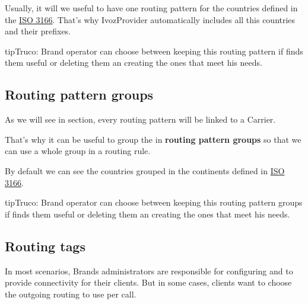 \documentclass[letterpaper,10pt,spanish]{sphinxmanual}
\begin{document}
Usually, it will we useful to have one routing pattern for the countries
defined in the \href{https://en.wikipedia.org/wiki/ISO\_3166}{ISO 3166}. That's why IvozProvider automatically
includes all this countries and their prefixes.

\begin{notice}{tip}{Truco:}
Brand operator can choose between keeping this routing pattern if
finds them useful or deleting them an creating the ones that meet his needs.
\end{notice}


\subsection{Routing pattern groups}
\label{administration_portal/brand/routing/routing_patterns_groups::doc}\label{administration_portal/brand/routing/routing_patterns_groups:routing-pattern-groups}\label{administration_portal/brand/routing/routing_patterns_groups:id1}
As we will see in {\hyperref[administration_portal/brand/routing/outgoing_routings:outgoing\string-routings]{}} section, every routing
pattern will be linked to a Carrier.

That's why it can be useful to group the {\hyperref[administration_portal/brand/routing/routing_patterns:id1]{}} in \textbf{routing pattern groups}
so that we can use a whole group in a routing rule.

By default we can see the countries grouped in the continents defined in
\href{https://en.wikipedia.org/wiki/ISO\_3166}{ISO 3166}.

\begin{notice}{tip}{Truco:}
Brand operator can choose between keeping this routing pattern groups if
finds them useful or deleting them an creating the ones that meet his needs.
\end{notice}


\subsection{Routing tags}
\label{administration_portal/brand/routing/routing_tags:routing-tags}\label{administration_portal/brand/routing/routing_tags::doc}
In most scenarios, Brands administrators are responsible for configuring
{\hyperref[administration_portal/brand/providers/carriers:carriers]{}} and {\hyperref[administration_portal/brand/routing/outgoing_routings:outgoing\string-routings]{}} to provide connectivity for
their clients. But in some cases, clients want to choose the outgoing routing to
use per call.
\end{document}
